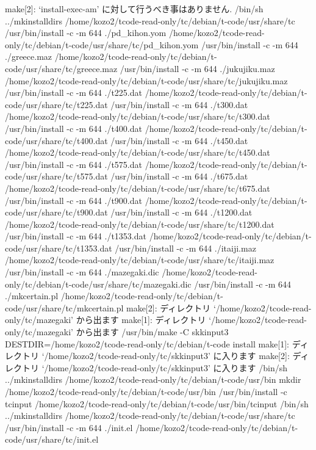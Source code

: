 \documentclass[mingoth,a4paper]{jsarticle}
\begin{document}
\begin{commandline}
make[2]: `install-exec-am' に対して行うべき事はありません.
/bin/sh ../mkinstalldirs /home/kozo2/tcode-read-only/tc/debian/t-code/usr/share/tc
 /usr/bin/install -c -m 644 ./pd_kihon.yom /home/kozo2/tcode-read-only/tc/debian/t-code/usr/share/tc/pd_kihon.yom
 /usr/bin/install -c -m 644 ./greece.maz /home/kozo2/tcode-read-only/tc/debian/t-code/usr/share/tc/greece.maz
 /usr/bin/install -c -m 644 ./jukujiku.maz /home/kozo2/tcode-read-only/tc/debian/t-code/usr/share/tc/jukujiku.maz
 /usr/bin/install -c -m 644 ./t225.dat /home/kozo2/tcode-read-only/tc/debian/t-code/usr/share/tc/t225.dat
 /usr/bin/install -c -m 644 ./t300.dat /home/kozo2/tcode-read-only/tc/debian/t-code/usr/share/tc/t300.dat
 /usr/bin/install -c -m 644 ./t400.dat /home/kozo2/tcode-read-only/tc/debian/t-code/usr/share/tc/t400.dat
 /usr/bin/install -c -m 644 ./t450.dat /home/kozo2/tcode-read-only/tc/debian/t-code/usr/share/tc/t450.dat
 /usr/bin/install -c -m 644 ./t575.dat /home/kozo2/tcode-read-only/tc/debian/t-code/usr/share/tc/t575.dat
 /usr/bin/install -c -m 644 ./t675.dat /home/kozo2/tcode-read-only/tc/debian/t-code/usr/share/tc/t675.dat
 /usr/bin/install -c -m 644 ./t900.dat /home/kozo2/tcode-read-only/tc/debian/t-code/usr/share/tc/t900.dat
 /usr/bin/install -c -m 644 ./t1200.dat /home/kozo2/tcode-read-only/tc/debian/t-code/usr/share/tc/t1200.dat
 /usr/bin/install -c -m 644 ./t1353.dat /home/kozo2/tcode-read-only/tc/debian/t-code/usr/share/tc/t1353.dat
 /usr/bin/install -c -m 644 ./itaiji.maz /home/kozo2/tcode-read-only/tc/debian/t-code/usr/share/tc/itaiji.maz
 /usr/bin/install -c -m 644 ./mazegaki.dic /home/kozo2/tcode-read-only/tc/debian/t-code/usr/share/tc/mazegaki.dic
 /usr/bin/install -c -m 644 ./mkcertain.pl /home/kozo2/tcode-read-only/tc/debian/t-code/usr/share/tc/mkcertain.pl
make[2]: ディレクトリ `/home/kozo2/tcode-read-only/tc/mazegaki' から出ます
make[1]: ディレクトリ `/home/kozo2/tcode-read-only/tc/mazegaki' から出ます
/usr/bin/make -C skkinput3  DESTDIR=/home/kozo2/tcode-read-only/tc/debian/t-code install
make[1]: ディレクトリ `/home/kozo2/tcode-read-only/tc/skkinput3' に入ります
make[2]: ディレクトリ `/home/kozo2/tcode-read-only/tc/skkinput3' に入ります
/bin/sh ../mkinstalldirs /home/kozo2/tcode-read-only/tc/debian/t-code/usr/bin
mkdir /home/kozo2/tcode-read-only/tc/debian/t-code/usr/bin
 /usr/bin/install -c tcinput /home/kozo2/tcode-read-only/tc/debian/t-code/usr/bin/tcinput
/bin/sh ../mkinstalldirs /home/kozo2/tcode-read-only/tc/debian/t-code/usr/share/tc
 /usr/bin/install -c -m 644 ./init.el /home/kozo2/tcode-read-only/tc/debian/t-code/usr/share/tc/init.el

\end{commandline}
\end{document}
